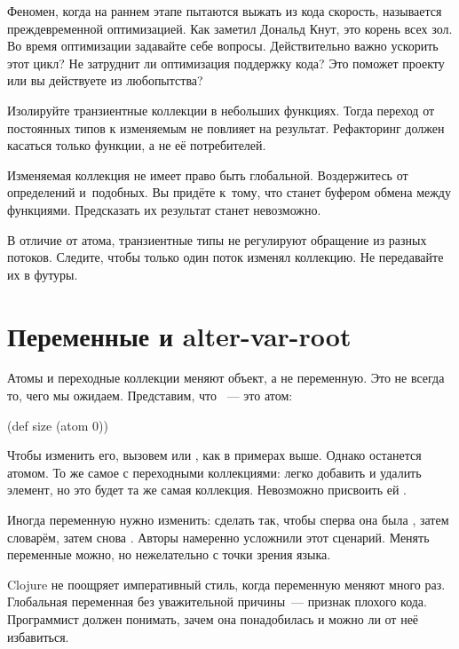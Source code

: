 
Феномен, когда на раннем этапе пытаются выжать из кода скорость, называется
преждевременной оптимизацией. Как заметил Дональд Кнут, это корень всех зол. Во
время оптимизации задавайте себе вопросы. Действительно важно ускорить этот
цикл? Не затруднит ли оптимизация поддержку кода? Это поможет проекту или вы
действуете из любопытства?

Изолируйте транзиентные коллекции в небольших функциях. Тогда переход от
постоянных типов к изменяемым не повлияет на результат. Рефакторинг должен
касаться только функции, а не её потребителей.

Изменяемая коллекция не имеет право быть глобальной. Воздержитесь от определений
 и~подобных. Вы придёте к~тому, что
 станет буфером обмена между функциями. Предсказать их результат
станет невозможно.

В отличие от атома, транзиентные типы не регулируют обращение из разных
потоков. Следите, чтобы только один поток изменял коллекцию. Не передавайте их в
футуры.

\section{Переменные и alter-var-root}


\label{alter-var-root}

Атомы и переходные коллекции меняют объект, а не переменную. Это не всегда то,
чего мы ожидаем. Представим, что ~--- это атом:

\begin{clojure}
(def size (atom 0))
\end{clojure}

Чтобы изменить его, вызовем  или , как в примерах
выше. Однако  останется атомом. То же самое с переходными
коллекциями: легко добавить и удалить элемент, но это будет та же самая
коллекция. Невозможно присвоить ей .

Иногда переменную нужно изменить: сделать так, чтобы сперва она была
, затем словарём, затем снова . Авторы намеренно
усложнили этот сценарий. Менять переменные можно, но нежелательно с точки зрения
языка.

Clojure не поощряет императивный стиль, когда переменную меняют много
раз. Глобальная переменная без уважительной причины~--- признак плохого кода.
Программист должен понимать, зачем она понадобилась и можно ли от неё
избавиться.

